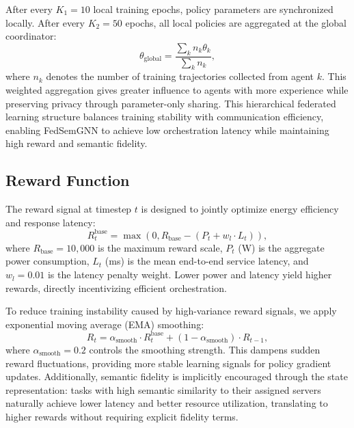 \documentclass[conference]{IEEEtran}
\begin{document}
	After every $K_1 = 10$ local training epochs, policy parameters are synchronized locally. After every $K_2 = 50$ epochs, all local policies are aggregated at the global coordinator:
	\begin{equation}
		\theta_{\text{global}} = \frac{\sum_{k} n_k \theta_k}{\sum_{k} n_k},
	\end{equation}
	where $n_k$ denotes the number of training trajectories collected from agent $k$. This weighted aggregation gives greater influence to agents with more experience while preserving privacy through parameter-only sharing. This hierarchical federated learning structure balances training stability with communication efficiency, enabling FedSemGNN to achieve low orchestration latency while maintaining high reward and semantic fidelity.
	
	\subsection{Reward Function}
	The reward signal at timestep $t$ is designed to jointly optimize energy efficiency and response latency:
	\begin{equation}
		R_t^{\text{base}} = \max\!\left(0, R_{\text{base}} - \left(P_t + w_l \cdot L_t\right)\right),
		\label{eq:base_reward}
	\end{equation}
	where $R_{\text{base}} = 10{,}000$ is the maximum reward scale, $P_t$ (W) is the aggregate power consumption, $L_t$ (ms) is the mean end-to-end service latency, and $w_l = 0.01$ is the latency penalty weight. Lower power and latency yield higher rewards, directly incentivizing efficient orchestration.
	
	To reduce training instability caused by high-variance reward signals, we apply exponential moving average (EMA) smoothing:
	\begin{equation}
		R_t = \alpha_{\text{smooth}} \cdot R_t^{\text{base}} + (1 - \alpha_{\text{smooth}}) \cdot R_{t-1},
		\label{eq:smoothed_reward}
	\end{equation}
	where $\alpha_{\text{smooth}} = 0.2$ controls the smoothing strength. This dampens sudden reward fluctuations, providing more stable learning signals for policy gradient updates. Additionally, semantic fidelity is implicitly encouraged through the state representation: tasks with high semantic similarity to their assigned servers naturally achieve lower latency and better resource utilization, translating to higher rewards without requiring explicit fidelity terms.
	
\end{document}
